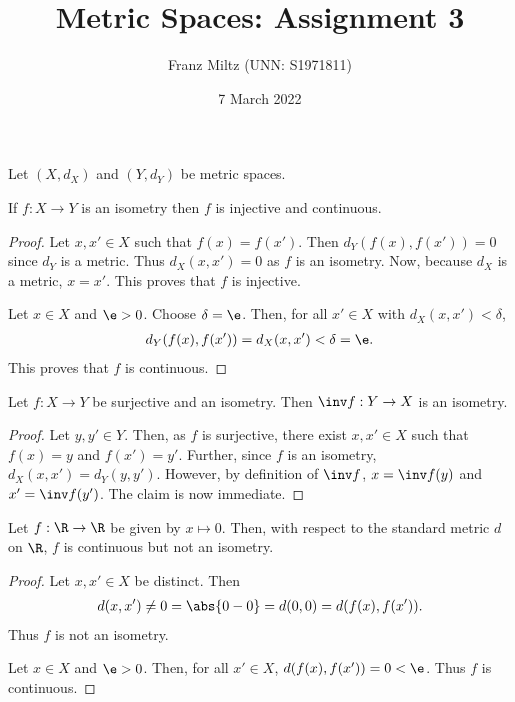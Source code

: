\documentclass{article}
\begin{document}
\title{Metric Spaces: Assignment 3}
\author{Franz Miltz (UNN: S1971811)}
\date{7 March 2022}
\maketitle

Let $(X,d_X)$ and $(Y,d_Y)$ be metric spaces.

\begin{claim*}[1a]
   If $f:X\to Y$ is an isometry then $f$ is injective and continuous.
   \begin{proof}
      Let $x,x'\in X$ such that $f(x)=f(x')$. Then $d_Y(f(x),f(x'))=0$ since $d_Y$ is a metric.
      Thus $d_X(x,x')=0$ as $f$ is an isometry. Now, because $d_X$ is a metric, $x=x'$. This proves 
      that $f$ is injective.

      Let $x\in X$ and $\e>0$. Choose $\delta=\e$. Then, for all $x'\in X$ with $d_X(x,x')<\delta$, 
      \begin{align*}
         d_Y(f(x),f(x')) = d_X(x,x') < \delta = \e.
      \end{align*}
      This proves that $f$ is continuous.
   \end{proof}
\end{claim*}

\begin{claim*}[1b]
   Let $f:X\to Y$ be surjective and an isometry. Then $\inv f:Y\to X$ is an isometry.
   \begin{proof}
      Let $y,y'\in Y$. Then, as $f$ is surjective, there exist $x,x'\in X$ such that 
      $f(x)=y$ and $f(x')=y'$. Further, since $f$ is an isometry, $d_X(x,x')=d_Y(y,y')$.     
      However, by definition of $\inv f$, $x=\inv f(y)$ and $x'=\inv f(y')$. The claim is 
      now immediate.
   \end{proof}
\end{claim*}

\begin{claim*}[2]
   Let $f:\R\to \R$ be given by $x\mapsto 0$. Then, with respect to the standard metric 
   $d$ on $\R$, $f$ is continuous but not an isometry.
   \begin{proof}
      Let $x,x'\in X$ be distinct. Then 
      \begin{align*}
         d(x,x') \not= 0 = \abs{0-0} = d(0, 0) = d(f(x), f(x')).
      \end{align*}
      Thus $f$ is not an isometry.

      Let $x\in X$ and $\e>0$. Then, for all $x'\in X$, $d(f(x),f(x'))=0<\e$.
      Thus $f$ is continuous.
   \end{proof}
\end{claim*}
\end{document}
